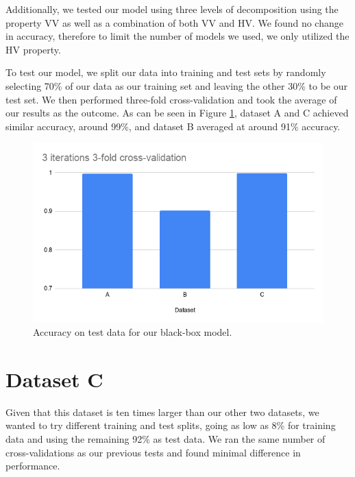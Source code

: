 \documentclass{turabian-thesis}[12pt]
\begin{document}
Additionally, we tested our model using three levels of decomposition using the property VV as well as a combination of both VV and HV. We found no change in accuracy, therefore to limit the number of models we used, we only utilized the HV property.


To test our model, we split our data into training and test sets by randomly selecting 70\% of our data as our training set and leaving the other 30\% to be our test set. We then performed three-fold cross-validation and took the average of our results as the outcome. As can be seen in Figure \ref{fig:final_results}, dataset A and C achieved similar accuracy, around 99\%, and dataset B averaged at around 91\% accuracy.


\begin{figure}[h!]
   \begin{center}
      \includegraphics[scale=0.6]{../media/results.png}
   \end{center}
   \caption{Accuracy on test data for our black-box model.}
   \label{fig:final_results}
\end{figure}

\section{Dataset C}

Given that this dataset is ten times larger than our other two datasets, we wanted to try different training and test splits, going as low as 8\% for training data and using the remaining 92\% as test data. We ran the same number of cross-validations as our previous tests and found minimal difference in performance.


\end{document}
